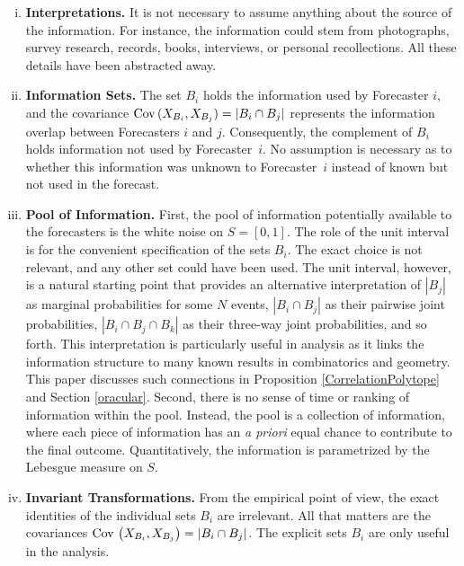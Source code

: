 \documentclass[12pt]{article}
\theoremstyle{definition}
\theoremstyle{definition}
\def\Cov{{\rm Cov}\,}
\begin{document}
\begin{enumerate}[(i)]
\item {\bf Interpretations.} It is not necessary to assume anything 
about the source of the information.  For instance, the information 
could stem from photographs, survey research, records, books, 
interviews, or personal recollections.  All these details have 
been abstracted away.

\item {\bf Information Sets.} The set $B_i$ holds the information used
by Forecaster $i$, and the covariance $\Cov (X_{B_i} , X_{B_j}) = |B_{i} \cap B_{j}|$
represents the information overlap between Forecasters $i$ and
$j$.
Consequently, the complement of $B_i$ holds information not used by
Forecaster~$i$.  No assumption is necessary as to whether this
information was unknown to Forecaster~$i$ instead of known but not
used in the forecast.


\item {\bf Pool of Information.} First, the pool of
information potentially available to the forecasters is the white
noise on $S = [0,1]$. The role of the unit interval
is for the convenient specification of the sets $B_i$.
The exact choice is not relevant, and
any other set could have been used. The unit interval, however, is a
natural starting point that provides an alternative interpretation of $|B_j|$ as marginal probabilities for some $N$ events, $|B_i \cap B_j|$ as their pairwise joint probabilities, $|B_i \cap B_j
\cap B_k|$ as their three-way joint probabilities,
and so forth.  This interpretation is particularly useful in analysis as it links the
information structure to many known results in combinatorics and geometry. This paper discusses such connections in Proposition \ref{CorrelationPolytope} and Section \ref{oracular}. Second, there is
no sense of time or ranking of information within the
pool. Instead, the pool is a collection of information, where each
piece of information has an {\em a priori} equal chance to contribute
to the final outcome.  Quantitatively, the information is parametrized
by the Lebesgue measure on $S$.
\label{item:pool}


\item {\bf Invariant Transformations.}  From the empirical point of
view, the exact identities of the individual sets $B_i$ are
irrelevant.  All that matters are the covariances $\Cov \left(X_{B_i}
, X_{B_j}\right) = |B_i \cap B_j|$.  The explicit sets $B_i$ are only useful in the analysis.


\end{enumerate}
\end{document}
